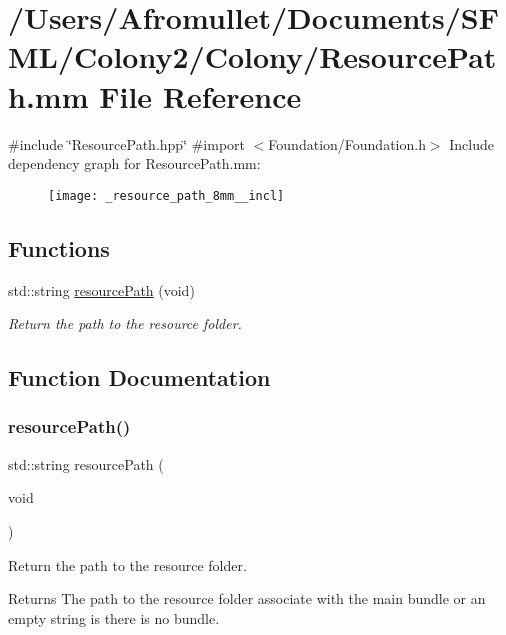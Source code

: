 \hypertarget{_resource_path_8mm}{}\section{/\+Users/\+Afromullet/\+Documents/\+S\+F\+M\+L/\+Colony2/\+Colony/\+Resource\+Path.mm File Reference}
\label{_resource_path_8mm}
{\ttfamily \#include \char`\"{}Resource\+Path.\+hpp\char`\"{}}\newline
{\ttfamily \#import $<$Foundation/\+Foundation.\+h$>$}\newline
Include dependency graph for Resource\+Path.\+mm\+:
\nopagebreak
\begin{figure}[H]
\begin{center}
\leavevmode
\texttt{[image: \_resource\_path\_8mm\_\_incl]}
\end{center}
\end{figure}
\subsection*{Functions}
\begin{DoxyCompactItemize}
\item 
std\+::string \mbox{\hyperlink{_resource_path_8mm_a377b456e3964835648f2d726c2e4f510}{resource\+Path}} (void)
\begin{DoxyCompactList}\small\item\em Return the path to the resource folder. \end{DoxyCompactList}\end{DoxyCompactItemize}


\subsection{Function Documentation}
\mbox{\label{_resource_path_8mm_a377b456e3964835648f2d726c2e4f510}} 
\subsubsection{\texorpdfstring{resource\+Path()}{resourcePath()}}
{\footnotesize\ttfamily std\+::string resource\+Path (\begin{DoxyParamCaption}\item[{void}]{ }\end{DoxyParamCaption})}



Return the path to the resource folder. 

\begin{DoxyReturn}{Returns}
The path to the resource folder associate with the main bundle or an empty string is there is no bundle. \begin{DoxyVerb}\end{DoxyVerb}
 
\end{DoxyReturn}
